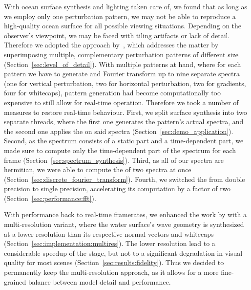 With ocean surface synthesis and lighting taken care of, we found that
as long as we employ only one perturbation pattern, we may not
be able to reproduce a high-quality ocean surface for all possible
viewing situations. Depending on the observer's viewpoint, we may be
faced with tiling artifacts or lack of detail.
Therefore we adopted the approach by~\citet{misc:oceanlightingfft},
which addresses the matter by superimposing multiple, complementary perturbation
patterns of different size (Section~\ref{sec:level_of_detail}).
With multiple patterns at hand, where for each pattern we have to
generate and Fourier transform up to nine separate spectra (one for vertical
perturbation, two for horizontal perturbation, two for gradients,
four for whitecaps), pattern generation had become computationally too
expensive to still allow for real-time operation.
Therefore we took a number of measures to restore real-time behaviour.
First, we split surface synthesis into two separate threads, where the first
one generates the pattern's actual spectra, and the second one
applies the \InvFourierTransform on said spectra (Section~\ref{sec:demo_application}).
Second, as the spectrum consists of a static part and a time-dependent part,
we made sure to compute only the time-dependent part of the spectrum for each
frame (Section~\ref{sec:spectrum_synthesis}).
Third, as all of our spectra are hermitian, we were able to compute the
\InvFourierTransform of two spectra at once (Section~\ref{sec:discrete_fourier_transform}).
Fourth, we switched the \InvFourierTransform from double precision to single
precision, accelerating its computation by a factor of two
(Section~\ref{sec:performance:fft}).

With performance back to real-time framerates, we enhanced the work by
\citet{misc:oceanlightingfft} with a multi-resolution variant, where
the water surface's wave geometry is synthesized at a lower resolution
than its respective normal vectors and whitecaps
(Section~\ref{sec:implementation:multires}).
The lower resolution lead to a considerable speedup of the \FourierTransform
stage, but not to a significant degradation in visual quality for most scenes
(Section~\ref{sec:results:fidelity}).
Thus we decided to permanently keep the multi-resolution approach, as it
allows for a more fine-grained balance between model detail and performance.
%

